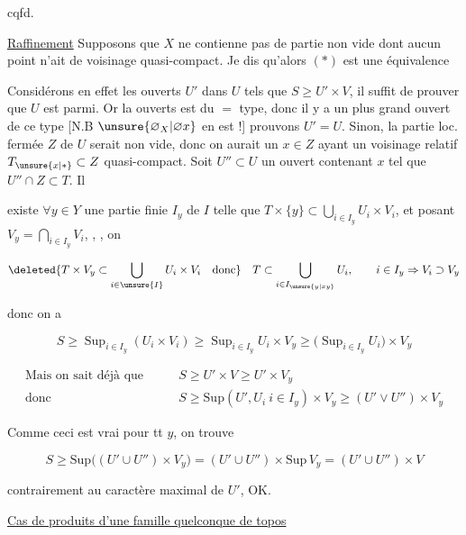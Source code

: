 \hfill cqfd.

\uline{Raffinement} \quad Supposons que $X$  ne contienne pas de partie  non vide dont aucun point n'ait de voisinage  quasi-compact. Je dis qu'alors $(*)$ est une équivalence

Considérons en effet les ouverts $U'$ dans $U$ tels que $S\geq U'\times V$, il suffit de prouver que $U$ est parmi. Or la   ouverts est du $=$ type, donc il y a un plus grand ouvert  de ce type [N.B $\unsure{\varnothing_X|\varnothing x}$ en est !] prouvons $U'=U$.  Sinon, la partie loc. fermée $Z$ de $U$  serait non vide, donc on aurait un $x\in Z$ ayant un voisinage relatif $T_{\unsure{x|*}}\subset Z$ quasi-compact. Soit $U''\subset U$ un ouvert contenant $x$ tel que $U''\cap Z\subset T$.  Il

existe $\forall y\in Y$ une partie finie $I_y$ de $I$ telle que $T\times\{y\}\subset\bigcup_{i\in I_y}U_i\times V_i$, et posant $V_y=\bigcap_{i\in I_y}V_i$, , , on

\[
\deleted{T\times V_y\subset\bigcup_{i\in\unsure{I}}U_i\times V_i\quad\text{donc}}\quad
 T\subset\bigcup_{i\in I_{\unsure{y|xy}}}U_i,\qquad i\in I_y\Rightarrow V_i\supset V_y
\]

donc on a

\[
S\geq\mathop{\mathrm{Sup}}_{i\in I_y}(U_i\times V_i)\geq\mathop{\mathrm{Sup}}_{i\in I_y}U_i\times V_y\geq\bigl(\mathop{\mathrm{Sup}}_{i\in I_y}U_i\bigr)\times V_y
\]

\[
\begin{aligned}
\text{Mais on sait déjà que}\qquad &S\geq U'\times V\geq U'\times V_y\\
\text{donc}\qquad &S\geq\mathrm{Sup}(U',U_i\ i\in I_y)\times V_y\geq(U'\vee U'')\times V_y
\end{aligned}
\]

Comme ceci est vrai pour tt $y$, on trouve

\[
S\geq\mathrm{Sup}\bigl((U'\cup U'')\times V_y\bigr)
 =(U'\cup U'')\times\mathrm{Sup}\,V_y=(U'\cup U'')\times V
\]

contrairement au caractère maximal de $U'$, OK.

\uline{Cas de produits  d'une famille quelconque de topos}


